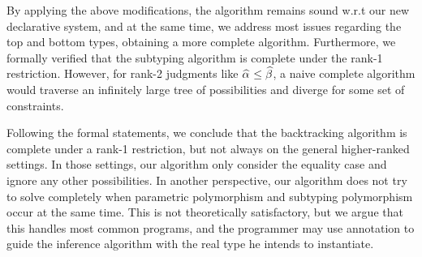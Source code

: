 By applying the above modifications,
the algorithm remains sound w.r.t our new declarative system,
and at the same time, we address most issues regarding the top and bottom types,
obtaining a more complete algorithm.
Furthermore, we formally verified that the subtyping algorithm
is complete under the rank-1 restriction.
However, for rank-2 judgments like $\al \le \bt$,
a naive complete algorithm would traverse an infinitely large tree of possibilities
and diverge for some set of constraints.

Following the formal statements, we conclude that the backtracking algorithm
is complete under a rank-1 restriction, but not always on the general higher-ranked settings.
In those settings, our algorithm only consider the equality case and ignore any other possibilities.
In another perspective, our algorithm does not try to solve completely when
parametric polymorphism and subtyping polymorphism occur at the same time.
This is not theoretically satisfactory, but we argue that
this handles most common programs, and the programmer may use annotation to guide
the inference algorithm with the real type he intends to instantiate.


